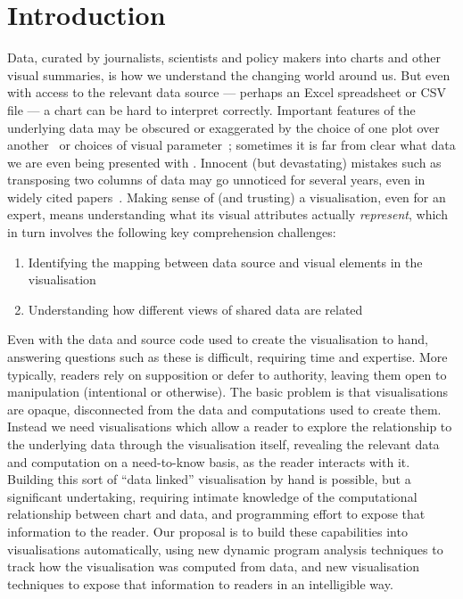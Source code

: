 \section{Introduction}

Data, curated by journalists, scientists and policy makers into charts and other visual summaries, is how we understand the changing world around us. But even with access to the relevant data source --- perhaps an Excel spreadsheet or CSV file --- a chart can be hard to interpret correctly. Important features of the underlying data may be obscured or exaggerated by the choice of one plot over another~\cite{weissgerber15} or choices of visual parameter~\cite{correll19}; sometimes it is far from clear what data we are even being presented with \cite{fullfact19}. Innocent (but devastating) mistakes such as transposing two columns of data may go unnoticed for several years, even in widely cited papers~\cite{miller06}. Making sense of (and trusting) a visualisation, even for an expert, means understanding what its visual attributes actually \emph{represent}, which in turn involves the following key comprehension challenges:

\begin{enumerate}
  \item Identifying the mapping between data source and visual elements in the visualisation
  \item Understanding how different views of shared data are related
\end{enumerate}

\noindent Even with the data and source code used to create the visualisation to hand, answering questions such as these is difficult, requiring time and expertise. More typically, readers rely on supposition or defer to authority, leaving them open to manipulation (intentional or otherwise). The basic problem is that visualisations are opaque, disconnected from the data and computations used to create them. Instead we need visualisations which allow a reader to explore the relationship to the underlying data through the visualisation itself, revealing the relevant data and computation on a need-to-know basis, as the reader interacts with it. Building this sort of ``data linked'' visualisation by hand is possible, but a significant undertaking, requiring intimate knowledge of the computational relationship between chart and data, and programming effort to expose that information to the reader. Our proposal is to build these capabilities into visualisations automatically, using new dynamic program analysis techniques to track how the visualisation was computed from data, and new visualisation techniques to expose that information to readers in an intelligible way.




